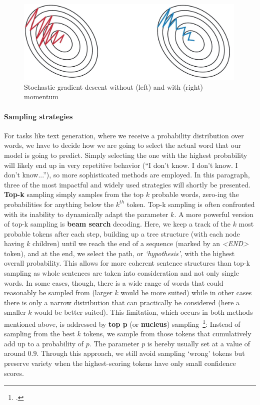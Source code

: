 \begin{figure}
	\includegraphics[height=4cm]{img/momentum}
	\caption{Stochastic gradient descent without (left) and with (right) momentum}
	\label{fig:momentum}
\end{figure}

\paragraph{Sampling strategies}
For tasks like text generation, where we receive a probability distribution over words, we have to decide how we are going to select the actual word that our model is going to predict. Simply selecting the one with the highest probability will likely end up in very repetitive behavior (``I don't know. I don't know. I don't know...''), so more sophisticated methods are employed. In this paragraph, three of the most impactful and widely used strategies will shortly be presented. \textbf{Top-k} sampling simply samples from the top $ k $ probable words, zero-ing the probabilities for anything below the $ k^{th} $ token. Top-k sampling is often confronted with its inability to dynamically adapt the parameter $ k $. A more powerful version of top-k sampling is \textbf{beam search} decoding. Here, we keep a track of the $ k $ most probable tokens after each step, building up a tree structure (with each node having $ k $ children) until we reach the end of a sequence (marked by an \textit{<END>} token), and at the end, we select the path, or \textit{`hypothesis'}, with the highest overall probability. This allows for more coherent sentence structures than top-k sampling as whole sentences are taken into consideration and not only single words. In some cases, though, there is a wide range of words that could reasonably be sampled from (larger $ k $ would be more suited) while in other cases there is only a narrow distribution that can practically be considered (here a smaller $ k $ would be better suited). This limitation, which occurs in both methods mentioned above, is addressed by \textbf{top p} (or \textbf{nucleus}) sampling~\footcite{DBLP:journals/corr/abs-1904-09751}: Instead of sampling from the best $ k $ tokens, we sample from those tokens that cumulatively add up to a probability of $ p $. The parameter $ p $ is hereby usually set at a value of around $ 0.9 $. Through this approach, we still avoid sampling `wrong' tokens but preserve variety when the highest-scoring tokens have only small confidence scores.

